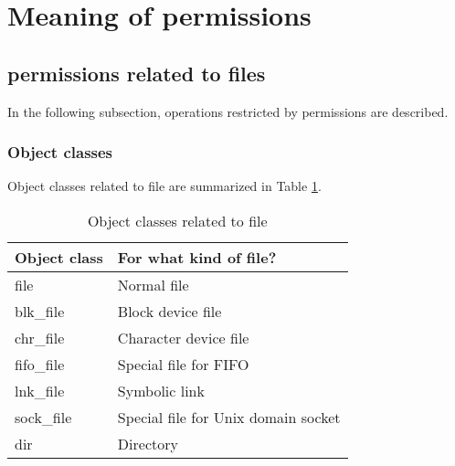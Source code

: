 \documentclass{article}
\begin{document}
\section{Meaning of permissions}
\subsection{permissions related to files}
In the following subsection, operations restricted by permissions are
described.
\subsubsection{Object classes}
Object classes related to file are summarized in Table \ref{tab:obfile}.
\begin{table}[h]
\caption{Object classes related to file}\label{tab:obfile}
\begin{center}
\begin{tabular}{|l|l|}
\hline
Object class & For what kind of file?\\
\hline
 file & Normal file\\
\hline
 blk\_file &  Block device file\\
\hline
 chr\_file & Character device file\\
\hline
fifo\_file & Special file for FIFO\\
\hline
lnk\_file & Symbolic link\\
\hline
sock\_file & Special file for Unix domain socket\\
\hline
dir & Directory\\
\hline
\end{tabular}
\end{center}
\end{table}
\end{document}
